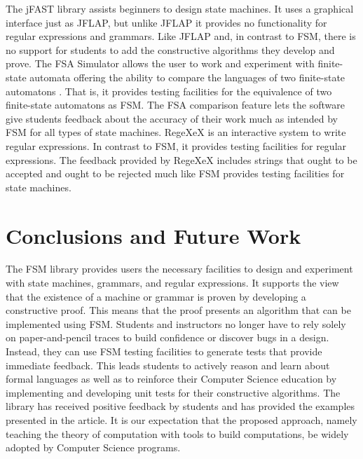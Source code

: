 \documentclass{eptcs}
\begin{document}
The jFAST \cite{White} library assists beginners to design state machines. It uses a graphical interface just as JFLAP, but unlike JFLAP it provides no functionality for regular expressions and grammars. Like JFLAP and, in contrast to \textsf{FSM}, there is no support for students to add the constructive algorithms they develop and prove. The FSA Simulator allows the user to work and experiment with finite-state automata offering the ability to compare the languages of two finite-state automatons \cite{Grinder}. That is, it provides testing facilities for the equivalence of two finite-state automatons as \textsf{FSM}. The FSA comparison feature lets the software give students feedback about the accuracy of their work much as intended by \textsf{FSM} for all types of state machines. RegeXeX \cite{Brown} is an interactive system to write regular expressions. In contrast to \textsf{FSM}, it provides testing facilities for regular expressions. The feedback provided by RegeXeX includes strings that ought to be accepted and ought to be rejected much like \textsf{FSM} provides testing facilities for state machines.

\section{Conclusions and Future Work}
The \textsf{FSM} library provides users the necessary facilities to design and experiment with state machines, grammars, and regular expressions. It supports the view that the existence of a machine or grammar is proven by developing a constructive proof. This means that the proof presents an algorithm that can be implemented using \textsf{FSM}. Students and instructors no longer have to rely solely on paper-and-pencil traces to build confidence or discover bugs in a design. Instead, they can use \textsf{FSM} testing facilities to generate tests that provide immediate feedback. This leads students to actively reason and learn about formal languages as well as to reinforce their Computer Science education by implementing and developing unit tests for their constructive algorithms. The library has received positive feedback by students and has provided the examples presented in the article. It is our expectation that the proposed approach, namely teaching the theory of computation with tools to build computations, be widely adopted by Computer Science programs.
\end{document}
